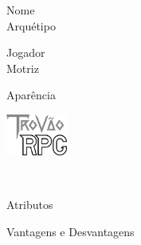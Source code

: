 \documentclass[a4paper]{article}
\begin{document}
	\begin{minipage}[t][][t]{\linewidth}
		\begin{minipage}[t][][t]{\dimexpr(\linewidth-2.8cm)\relax}
			\begin{minipage}[t][][t]{.5\linewidth}
				Nome \hrulefill \\
				Arqu\'{e}tipo \hrulefill
			\end{minipage}%
			\hspace{.01\linewidth}%
			\begin{minipage}[t][][t]{.49\linewidth}
				Jogador \hrulefill \\
				Motriz \hrulefill
			\end{minipage}
			Apar\^{e}ncia \hrulefill
		\end{minipage}%
		\hspace{.2cm}%
		\begin{minipage}[t][][t]{2cm}
			\includegraphics[width=2cm, valign=t]{img/logo.png}
		\end{minipage}
	\end{minipage}
	\vspace{1cm}\\
	\begin{minipage}[t][][t]{.5\linewidth}
		\centering Atributos	
	\end{minipage}%
	\begin{minipage}[t][][t]{.5\linewidth}
		\centering Vantagens e Desvantagens
	\end{minipage}
\end{document}

